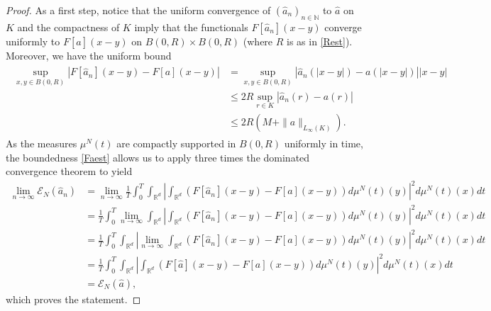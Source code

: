 \documentclass[A4paper,11pt]{article}
\theoremstyle{definition}
\newcommand{\N}{\mathbb{N}}
\newcommand{\R}{\mathbb{R}}
\begin{document}
\begin{proof}
As a first step, notice that the uniform convergence of $(\widehat a_n)_{n \in \N}$ to $\widehat a$ on $K$ and the compactness of $K$ imply that the functionals $F[\widehat a_n](x-y)$ converge uniformly to $F[\widehat a](x-y)$ on $B(0,R)\times B(0,R)$ (where $R$ is as in \eqref{Rest}). Moreover, we have the uniform bound
\begin{align}
\begin{split}\label{Faest}
\sup_{x,y\in B(0,R)}|F[\widehat a_n](x-y) - F[a](x-y)| &= \sup_{x,y\in B(0,R)}|\widehat a_n(|x-y|) -  a(|x-y|)| |x-y| \\
&\leq 2R \sup_{r\in K} |\widehat a_n(r) -  a(r)| \\
& \leq 2R(M + \|a\|_{L_{\infty}(K)}).
\end{split}
\end{align}
As the measures $\mu^N(t)$ are compactly supported in $B(0,R)$ uniformly in time, the boundedness \eqref{Faest} allows us to apply three times the dominated convergence theorem to yield
\begin{align*}
\lim_{n \rightarrow \infty} \mathcal E_N(\widehat a_n) &= \lim_{n \rightarrow \infty}\frac{1}{T}\int_0^T\int_{\R^d} \left| \int_{\R^d}
			\left(F[\widehat a_n](x-y)-F[a](x-y)\right)d\mu^N(t)(y)\right|^2d\mu^N(t)(x) dt\\
			&= \frac{1}{T}\int_0^T\lim_{n \rightarrow \infty}\int_{\R^d} \left| \int_{\R^d}
			\left(F[\widehat a_n](x-y)-F[a](x-y)\right)d\mu^N(t)(y)\right|^2 d\mu^N(t)(x) dt\\
			&= \frac{1}{T}\int_0^T\int_{\R^d} \left| \lim_{n \rightarrow \infty}\int_{\R^d}
			\left(F[\widehat a_n](x-y)-F[a](x-y)\right)d\mu^N(t)(y)\right|^2 d\mu^N(t)(x) dt\\
			&= \frac{1}{T}\int_0^T\int_{\R^d} \left| \int_{\R^d}
			\left(F[\widehat a](x-y)-F[a](x-y)\right)d\mu^N(t)(y)\right|^2 d\mu^N(t)(x) dt\\
&=  \mathcal E_N(\widehat a),
\end{align*}
which proves the statement.


\end{proof}
\end{document}
